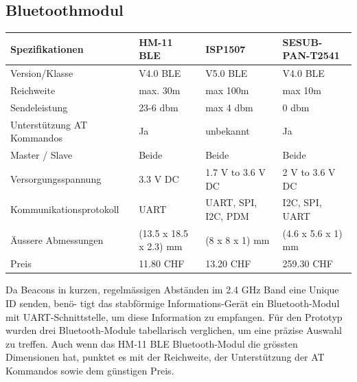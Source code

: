 \begin{landscape}
\subsection{Bluetoothmodul}
\begin{table}[H]
\begin{tabular}{|l|lll|}
\hline 
\textbf{Spezifikationen} & \textbf{HM-11 BLE} & \textbf{ISP1507 } & \textbf{SESUB-PAN-T2541} \\ 
\hline 
Version/Klasse & V4.0 BLE  & V5.0 BLE & V4.0 BLE \\ 
\hline 
Reichweite & max. 30m & max 100m & max 10m \\ 
\hline 
Sendeleistung & 23-6 dbm & max 4 dbm & 0 dbm \\ 
\hline 
Unterstützung AT Kommandos & Ja & unbekannt & Ja \\ 
\hline 
Master / Slave & Beide & Beide & Beide \\ 
\hline 
Versorgungsspannung & 3.3 V DC & 1.7 V to 3.6 V DC & 2 V to 3.6 V DC \\ 
\hline 
Kommunikationsprotokoll & UART  & UART, SPI, I2C, PDM & I2C, SPI, UART \\ 
\hline 
Äussere Abmessungen & (13.5 x 18.5 x 2.3) mm & (8 x 8 x 1) mm & (4.6 x 5.6 x 1) mm \\ 
\hline 
Preis & 11.80 CHF & 13.20 CHF & 259.30 CHF \\ 
\hline 
\end{tabular} 
\end{table}
Da Beacons in kurzen, regelmässigen Abständen im 2.4 GHz Band eine Unique ID senden, benö-
tigt das stabförmige Informations-Gerät ein Bluetooth-Modul mit UART-Schnittstelle, um diese
Information zu empfangen. 
Für den Prototyp wurden drei Bluetooth-Module tabellarisch verglichen, um eine präzise Auswahl zu treffen. Auch wenn das HM-11 BLE Bluetooth-Modul die grössten Dimensionen hat, punktet es mit der Reichweite, der Unterstützung der AT Kommandos sowie dem günstigen Preis. 
\end{landscape}
